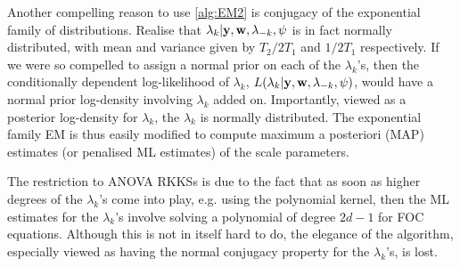 \begin{remark}
  Another compelling reason to use \cref{alg:EM2} is conjugacy of the exponential family of distributions.
  Realise that $\lambda_k|{\mathbf y},{\mathbf w},\lambda_{-k},\psi$ is in fact normally distributed, with mean and variance given by $T_2/2T_1$ and $1/2T_1$ respectively.
  If we were so compelled to assign a normal prior on each of the $\lambda_k$'s, then the conditionally dependent log-likelihood of $\lambda_k$, $L(\lambda_k|{\mathbf y},{\mathbf w},\lambda_{-k},\psi)$, would have a normal prior log-density involving $\lambda_k$ added on.
  Importantly, viewed as a posterior log-density for $\lambda_k$, the $\lambda_k$ is normally distributed.
  The exponential family EM is thus easily modified to compute maximum a posteriori (MAP) estimates (or penalised ML estimates) of the scale parameters.
\end{remark}

\begin{remark}
  The restriction to ANOVA RKKSs is due to the fact that as soon as higher degrees of the $\lambda_k$'s come into play, e.g. using the polynomial kernel, then the ML estimates for the $\lambda_k$'s involve solving a polynomial of degree $2d-1$ for FOC equations.
  Although this is not in itself hard to do, the elegance of the algorithm, especially viewed as having the normal conjugacy property for the $\lambda_k$'s, is lost.
\end{remark}

%
%
